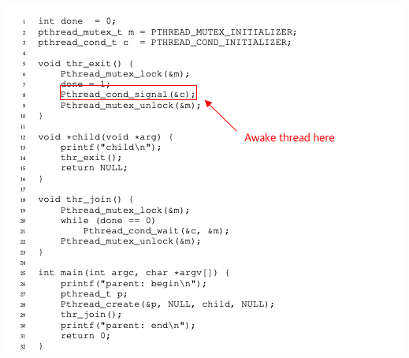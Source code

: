 \documentclass[12pt]{article}
\begin{document}
\begin{enumerate}[1.]
\begin{enumerate}[a)]
\begin{itemize}
\begin{itemize}
                \begin{center}
                \includegraphics[width=\linewidth]{images/midterm_2_solution_18.png}
                \end{center}

            \end{itemize}
        \end{itemize}
    \end{enumerate}

\end{enumerate}
\end{document}
